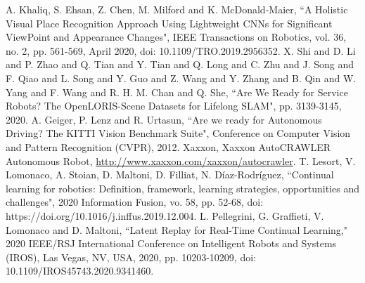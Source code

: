 \documentclass[letterpaper, 10 pt, conference]{ieeeconf}  %
\begin{document}
\begin{thebibliography}{99}
 A. Khaliq, S. Ehsan, Z. Chen, M. Milford and K. McDonald-Maier, ``A Holistic Visual Place Recognition Approach Using Lightweight CNNs for Significant ViewPoint and Appearance Changes", IEEE Transactions on Robotics, vol. 36, no. 2, pp. 561-569, April 2020, doi: 10.1109/TRO.2019.2956352.
 X. {Shi} and D. {Li} and P. {Zhao} and Q. {Tian} and Y. {Tian} and Q. {Long} and C. {Zhu} and J. {Song} and F. {Qiao} and L. {Song} and Y. {Guo} and Z. {Wang} and Y. {Zhang} and B. {Qin} and W. {Yang} and F. {Wang} and R. H. M. {Chan} and Q. {She}, ``Are We Ready for Service Robots? The OpenLORIS-Scene Datasets for Lifelong SLAM", pp. 3139-3145, 2020.
 A. Geiger, P. Lenz and R. Urtasun, ``Are we ready for Autonomous Driving? The KITTI Vision Benchmark Suite", Conference on Computer Vision and Pattern Recognition (CVPR), 2012.
 Xaxxon, Xaxxon AutoCRAWLER Autonomous Robot, \href{http://www.xaxxon.com/xaxxon/autocrawler}{http://www.xaxxon.com/xaxxon/autocrawler}.
 T. Lesort, V. Lomonaco, A. Stoian, D. Maltoni, D. Filliat, N. Díaz-Rodríguez,
``Continual learning for robotics: Definition, framework, learning strategies, opportunities and challenges", 2020 Information Fusion, vo. 58, pp. 52-68, doi: https://doi.org/10.1016/j.inffus.2019.12.004.
 L. Pellegrini, G. Graffieti, V. Lomonaco and D. Maltoni, ``Latent Replay for Real-Time Continual Learning," 2020 IEEE/RSJ International Conference on Intelligent Robots and Systems (IROS), Las Vegas, NV, USA, 2020, pp. 10203-10209, doi: 10.1109/IROS45743.2020.9341460.




\end{thebibliography}
\end{document}
